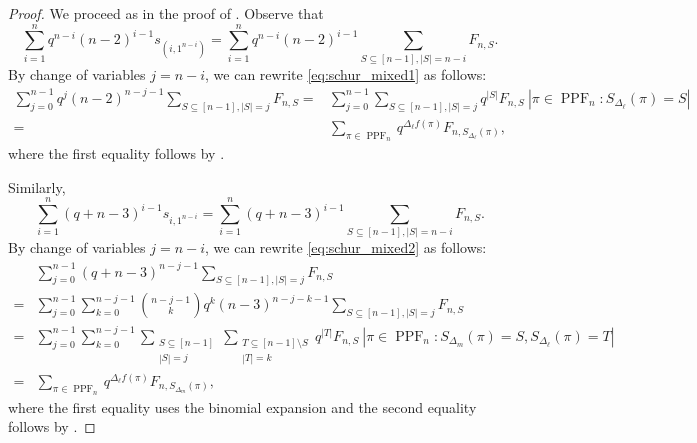 \documentclass[10pt,a4paper]{amsart}
\theoremstyle{definition}
\theoremstyle{remark}
\newcommand{\fd}{\Delta_{\ell} f}
\newcommand{\SetL}[1]{S_{\Delta_{#1}}}
\DeclareMathOperator{\PPF}{PPF}
\begin{document}
\setcounter{section}{6}
\setcounter{equation}{10}
\setcounter{definition}{6}
\setcounter{example}{8}
\setcounter{notation}{2}
\setcounter{problem}{0}
\setcounter{question}{0}
\setcounter{remark}{6}
\setcounter{theorem}{4}
\begin{proof}
We proceed as in the proof of . Observe that
\begin{equation}
\label{eq:schur_mixed1}
\sum_{i=1}^n q^{n-i}(n-2)^{i-1} s_{(i,1^{n-i})}= \sum_{i=1}^n q^{n-i}(n-2)^{i-1} \sum_{S\subseteq [n-1], |S|=n-i}F_{n,S}.
\end{equation}
By change of variables $j=n-i$, we can rewrite \eqref{eq:schur_mixed1} as follows:
\begin{align*}
    \sum_{j=0}^{n-1} q^j (n-2)^{n-j-1} \sum_{S\subseteq [n-1], |S|=j} F_{n,S}
    =&\sum_{j=0}^{n-1}  \sum_{S\subseteq [n-1], |S|=j}  q^{|S|} F_{n,S} ~|\pi \in \PPF_n : \SetL{\ell}(\pi)=S|\\
    =&\sum_{\pi \in \PPF_n} q^{\fd(\pi)} F_{n,\SetL{\ell}(\pi)},
\end{align*}
where the first equality follows by .

Similarly,
\begin{equation}
\label{eq:schur_mixed2}
\sum_{i=1}^n (q+n-3)^{i-1}s_{i,1^{n-i}}= \sum_{i=1}^n (q+n-3)^{i-1} \sum_{S\subseteq [n-1], |S|=n-i}F_{n,S}.
\end{equation}
By change of variables $j=n-i$, we can rewrite \eqref{eq:schur_mixed2} as follows:
\begin{align*}
    &\sum_{j=0}^{n-1} (q+n-3)^{n-j-1} \sum_{S\subseteq [n-1], |S|=j} F_{n,S}\\
    =&\sum_{j=0}^{n-1} \sum_{k=0}^{n-j-1} \binom{n-j-1}{k} q^k (n-3)^{n-j-k-1} \sum_{S\subseteq [n-1], |S|=j}  F_{n,S}\\
    =&\sum_{j=0}^{n-1} \sum_{k=0}^{n-j-1}   \sum_{\substack{S\subseteq [n-1] \\ |S|=j}} \sum_{\substack{T \subseteq [n-1]\setminus S \\ |T|=k}} q^{|T|} F_{n,S} ~|\pi \in \PPF_n : \SetL{m}(\pi)=S, \SetL{\ell}(\pi)=T| \\
    =&\sum_{\pi \in \PPF_n} q^{
\fd(\pi)} F_{n, \SetL{m}(\pi)},
\end{align*}
where the first equality uses the binomial expansion and the second equality follows by .
\end{proof}
\end{document}
